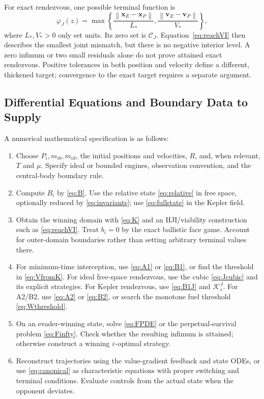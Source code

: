 \documentclass[journal,a4paper]{IEEEtran}
\newcommand{\C}{\mathcal C}
\newcommand{\norm}[1]{\left\|#1\right\|}
\begin{document}
For exact rendezvous, one possible terminal function is
\begin{equation}
 \varphi_J(z)=\max\left\{
      \frac{\norm{\mathbf x_E-\mathbf x_P}}{L_*},
      \frac{\norm{\mathbf v_E-\mathbf v_P}}{V_*}\right\},
 \label{eq:Jlevelset}
\end{equation}
where $L_*,V_*>0$ only set units. Its zero set is $\C_J$. Equation~\eqref{eq:reachVI} then describes the smallest joint mismatch, but there is no negative interior level. A zero infimum or two small residuals alone do not prove attained exact rendezvous. Positive tolerances in both position and velocity define a different, thickened target; convergence to the exact target requires a separate argument.

\subsection{Differential Equations and Boundary Data to Supply}
A numerical mathematical specification is as follows:
\begin{enumerate}
\item Choose $P_i,m_{i0},m_{id}$, the initial positions and velocities, $R$, and, when relevant, $T$ and $\mu$. Specify ideal or bounded engines, observation convention, and the central-body boundary rule.
\item Compute $B_i$ by \eqref{eq:B}. Use the relative state \eqref{eq:relative} in free space, optionally reduced by \eqref{eq:invariants}; use \eqref{eq:fullstate} in the Kepler field.
\item Obtain the winning domain with \eqref{eq:K} and an HJI/viability construction such as \eqref{eq:reachVI}. Treat $b_i=0$ by the exact ballistic face game. Account for outer-domain boundaries rather than setting arbitrary terminal values there.
\item For minimum-time interception, use \eqref{eq:A1} or \eqref{eq:B1}, or find the threshold in \eqref{eq:VfromK}. For ideal free-space rendezvous, use the cubic \eqref{eq:Jcubic} and its explicit strategies. For Kepler rendezvous, use \eqref{eq:B1J} and $\mathcal K_s^J$. For A2/B2, use \eqref{eq:A2} or \eqref{eq:B2}, or search the monotone fuel threshold \eqref{eq:Wthreshold}.
\item On an evader-winning state, solve \eqref{eq:FPDE} or the perpetual-survival problem \eqref{eq:Finfty}. Check whether the resulting infimum is attained; otherwise construct a winning $\varepsilon$-optimal strategy.
\item Reconstruct trajectories using the value-gradient feedback and state ODEs, or use \eqref{eq:canonical} as characteristic equations with proper switching and terminal conditions. Evaluate controls from the actual state when the opponent deviates.
\end{enumerate}
\end{document}

